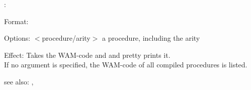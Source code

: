 \listcode:

Format: \\

Options: $<$procedure/arity$>$ a procedure, including the arity

Effect: Takes the WAM-code and and pretty prints it.\\
	If no argument is specified, the WAM-code of all compiled
	procedures is listed.

see also: \listing, \listclass
